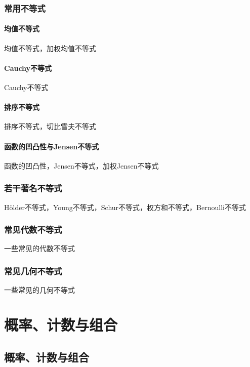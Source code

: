 \documentclass[lang=cn, zihao=5]{elegantbook}
\begin{document}
\section{常用不等式}

\subsection{均值不等式}

均值不等式，加权均值不等式

\subsection{Cauchy不等式}

Cauchy不等式

\subsection{排序不等式}

排序不等式，切比雪夫不等式

\subsection{函数的凹凸性与Jensen不等式}

函数的凹凸性，Jensen不等式，加权Jensen不等式

\section{若干著名不等式}

Hölder不等式，Young不等式，Schur不等式，权方和不等式，Bernoulli不等式

\section{常见代数不等式}

一些常见的代数不等式

\section{常见几何不等式}

一些常见的几何不等式

\part{概率、计数与组合}

\chapter{概率、计数与组合}
\end{document}
